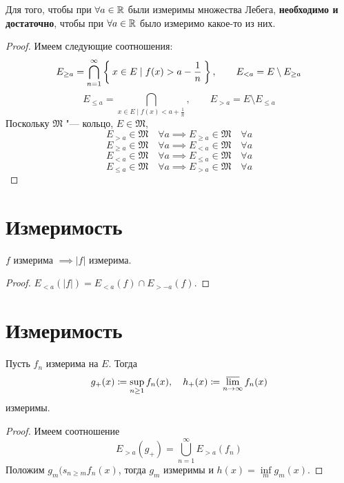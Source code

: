 \begin{theorem}
	Для того, чтобы при $ \forall a \in \mathbb{R} $ были измеримы множества Лебега, \textbf{необходимо и достаточно}, чтобы при $ \forall a \in \mathbb{R} $ было измеримо какое-то из них.
\end{theorem}

\begin{proof}
	Имеем следующие соотношения:
	$$ E_{\ge a} = \bigcap_{n = 1}^\infty \Set{x \in E \mid f(x) > a - \frac1n}, \qquad E_{<a} = E \setminus E_{\ge a} $$
	$$ E_{\le a} = \bigcap_{x \in E \mid f(x) < a + \frac1n}, \qquad E_{>a} = E \setminus E_{\le a} $$
	Поскольку $ \mathfrak M $ "--- кольцо, $ E \in \mathfrak M $,
	$$ E_{>a} \in \mathfrak M \quad \forall a \implies E_{\ge a} \in \mathfrak M \quad \forall a $$
	$$ E_{\ge a} \in \mathfrak M \quad \forall a \implies E_{<a} \in \mathfrak M \quad \forall a $$
	$$ E_{<a} \in \mathfrak M \quad \forall a \implies E_{\le a} \in \mathfrak M \quad \forall a $$
	$$ E_{\le a} \in \mathfrak M \quad \forall a \implies E_{>a} \in \mathfrak M \quad \forall a $$
\end{proof}

\section{Измеримость }

\begin{property}
	$ f $ измерима $ \implies |f| $ измерима.
\end{property}

\begin{proof}
	$ E_{<a}(|f|) = E_{<a}(f) \cap E_{>-a}(f) $.
\end{proof}

\section{Измеримость }

\begin{property}\label{prop:meas_prop:2}
	Пусть $ f_n $ измерима на $ E $. Тогда
	$$ g_+(x) \coloneq \sup\limits_{n \ge 1} f_n(x), \quad h_+(x) \coloneq \varlimsup\limits_{n \to \infty} f_n(x) $$
	измеримы.
\end{property}

\begin{proof}
	Имеем соотношение
	$$ E_{>a}(g_+) = \bigcup_{n = 1}^\infty E_{>a}(f_n) $$
	Положим $ g_m(s_{n \ge m} f_n(x) $, тогда $ g_m $ измеримы и $ h(x) = \inf\limits_m g_m(x) $.
\end{proof}

